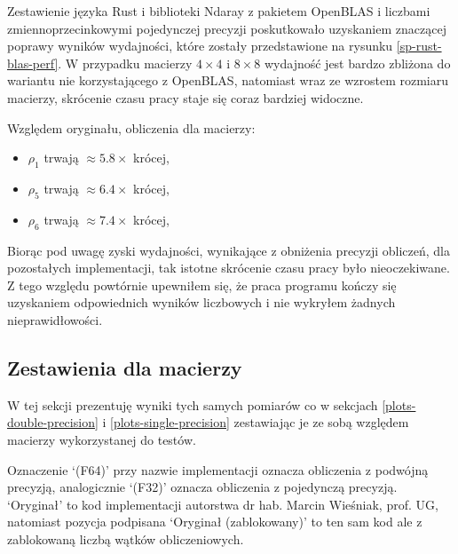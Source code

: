 \documentclass[11pt, a4paper]{article}
\begin{document}
\begin{sloppypar}
    Zestawienie języka Rust i biblioteki Ndaray z pakietem OpenBLAS i liczbami
    zmiennoprzecinkowymi pojedynczej precyzji poskutkowało uzyskaniem znaczącej poprawy
    wyników wydajności, które zostały przedstawione na rysunku \ref{sp-rust-blas-perf}.
    W przypadku macierzy $4\times4$ i $8\times8$ wydajność jest bardzo zbliżona do
    wariantu nie korzystającego z OpenBLAS, natomiast wraz ze wzrostem rozmiaru macierzy,
    skrócenie czasu pracy staje się coraz bardziej widoczne.

    \newpage


    Względem oryginału, obliczenia dla macierzy:
    \begin{itemize}
      \item $\rho_{1}$ trwają $\approx 5.8\times$ krócej,

      \item $\rho_{5}$ trwają $\approx 6.4\times$ krócej,

      \item $\rho_{6}$ trwają $\approx 7.4\times$ krócej,
    \end{itemize}
    Biorąc pod uwagę zyski wydajności, wynikające z obniżenia precyzji obliczeń, dla
    pozostałych implementacji, tak istotne skrócenie czasu pracy było nieoczekiwane. Z
    tego względu powtórnie upewniłem się, że praca programu kończy się uzyskaniem odpowiednich
    wyników liczbowych i nie wykryłem żadnych nieprawidłowości.

    \FloatBarrier

    \subsection{Zestawienia dla macierzy}
    W tej sekcji prezentuję wyniki tych samych pomiarów co w sekcjach
    \ref{plots-double-precision} i \ref{plots-single-precision} zestawiając je ze sobą
    względem macierzy wykorzystanej do testów.

    Oznaczenie `(F64)' przy nazwie implementacji oznacza obliczenia z podwójną precyzją,
    analogicznie `(F32)' oznacza obliczenia z pojedynczą precyzją. `Oryginał' to kod
    implementacji autorstwa dr hab. Marcin Wieśniak, prof. UG, natomiast pozycja
    podpisana `Oryginał (zablokowany)' to ten sam kod ale z zablokowaną liczbą wątków
    obliczeniowych.


\end{sloppypar}
\end{document}
